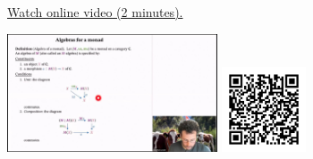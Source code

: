 
\begin{minipage}{10cm}
    \href{https://act4e-spring21.netlify.app/videos/spring2021-monads-b:algebra-monad.html}{Watch online video (2 minutes).}
        
    \href{https://act4e-spring21.netlify.app/videos/spring2021-monads-b:algebra-monad.html}{\includegraphics[height=3.5cm]{spring2021-monads-b:algebra-monad/thumbnails.jpg}}
    \href{https://act4e-spring21.netlify.app/videos/spring2021-monads-b:algebra-monad.html}{\includegraphics[height=2.5cm]{spring2021-monads-b:algebra-monad/qrcode.png}}
\end{minipage}
